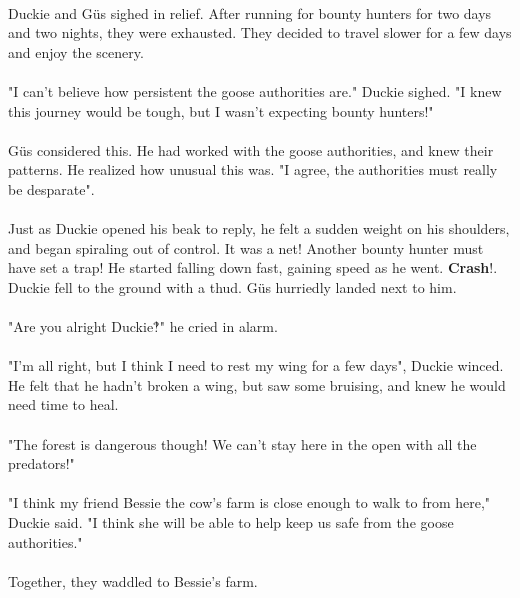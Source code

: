 \paragraph{} Duckie and Güs sighed in relief. After running for bounty hunters for two days and two nights, they were exhausted. They decided to travel slower for a few days and enjoy the scenery. 
\paragraph{} "I can't believe how persistent the goose authorities are." Duckie sighed. "I knew this journey would be tough, but I wasn't expecting bounty hunters!"
\paragraph{} Güs considered this. He had worked with the goose authorities, and knew their patterns. He realized how unusual this was. "I agree, the authorities must really be desparate".
\paragraph{} Just as Duckie opened his beak to reply, he felt a sudden weight on his shoulders, and began spiraling out of control. It was a net! Another bounty hunter must have set a trap! He started falling down fast, gaining speed as he went. \textbf{Crash}!. Duckie fell to the ground with a thud. Güs hurriedly landed next to him. 
\paragraph{} "Are you alright Duckie‽" he cried in alarm.
\paragraph{} "I'm all right, but I think I need to rest my wing for a few days", Duckie winced. He felt that he hadn't broken a wing, but saw some bruising, and knew he would need time to heal. 
 \paragraph{} "The forest is dangerous though! We can't stay here in the open with all the predators!"
 \paragraph{} "I think my friend Bessie the cow's farm is close enough to walk to from here," Duckie said. "I think she will be able to help keep us safe from the goose authorities."
 \paragraph{} Together, they waddled to Bessie's farm.